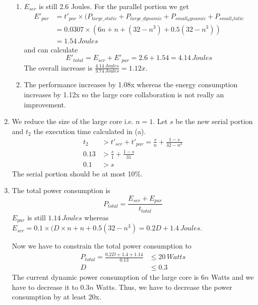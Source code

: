 \documentclass[a4paper]{article}
\begin{document}
\begin{enumerate}[label=\alph*)]
\begin{enumerate}[label=\roman*)]
            \item $E_{ser}$ is still 2.6 Joules. For the parallel portion we get
                \begin{equation*}
                    \begin{split}
                        E'_{par} &= t'_{par} \times (P_{large\_static}
                        + P_{large\_dynamic} + P_{small_dynamic}
                        + P_{small_static} \\
                        &= 0.0307 \times (6n + n + (32 - n^3) + 0.5(32 - n^3)) \\
                        &= 1.54 \, Joules
                    \end{split}
                \end{equation*}
                and can calculate
                \[E'_{total} = E_{ser} + E'_{par} = 2.6 + 1.54 = 4.14 \, Joules\]
                The overall increase is $\frac{4.14 \, Joules}{3.74 \, Joules} = 1.12x$.

            \item The performance increases by 1.08x whereas the energy
                consumption increases by 1.12x so the large core collaboration
                is not really an improvement.
        \end{enumerate}

    \item We reduce the size of the large core i.e. $n=1$. Let $s$ be the new
        serial portion and $t_2$ the execution time calculated in (a).
        \begin{equation*}
            \begin{split}
                t_2 &> t'_{ser} + t'_{par} = \frac{s}{n} + \frac{1-s}{32 - n^3} \\
                0.13 &> \frac{s}{1} + \frac{1-s}{31} \\
                0.1 &> s
            \end{split}
        \end{equation*}
        The serial portion should be at most 10\%.

    \item The total power consumption is
        \[ P_{total} = \frac{E_{ser} + E_{par}}{t_{total}} \]
        $E_{par}$ is still $1.14 \, Joules$ whereas
        $E_{ser} = 0.1 \times (D \times n + n + 0.5(32 - n^3) = 0.2D + 1.4 \,
        Joules$.

        Now we have to constrain the total power consumption to
        \begin{equation*}
            \begin{split}
                P_{total} = \frac{0.2D + 1.4 + 1.14}{0.13} &\leq 20 \, Watts \\
                D &\leq 0.3
            \end{split}
        \end{equation*}
        The current dynamic power consumption of the large core is $6n$ Watts
        and we have to decrease it to $0.3n$ Watts. Thus, we have to decrease
        the power consumption by at least 20x.
\end{enumerate}
\end{document}
